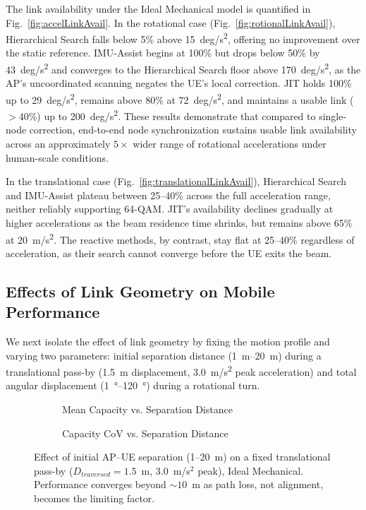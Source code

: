 \documentclass[fleqn,10pt]{wlscirep}
\newcommand{\rev}[1]{{\color{revblue}#1}}
\begin{document}
The link availability under the Ideal Mechanical model is quantified in Fig.~\ref{fig:accelLinkAvail}. In the rotational case (Fig.~\ref{fig:rotionalLinkAvail}), Hierarchical Search falls below 5\% above \SI{15}{deg/s^2}, offering no improvement over the static reference. IMU-Assist begins at 100\% but drops below 50\% by \SI{43}{deg/s^2} and converges to the Hierarchical Search floor above \SI{170}{deg/s^2}, as the AP's uncoordinated scanning negates the UE's local correction. JIT holds 100\% up to \SI{29}{deg/s^2}, remains above 80\% at \SI{72}{deg/s^2}, and maintains a usable link ($>$40\%) up to \SI{200}{deg/s^2}. These results demonstrate that compared to single-node correction, end-to-end node synchronization \rev{sustains usable link availability across an approximately $5\times$ wider range of rotational accelerations under human-scale conditions}.

In the translational case (Fig.~\ref{fig:translationalLinkAvail}), Hierarchical Search and IMU-Assist plateau between 25--40\% across the full acceleration range, neither reliably supporting 64-QAM. JIT's availability declines gradually at higher accelerations as the beam residence time shrinks, but remains above 65\% at \SI{20}{m/s^2}. The reactive methods, by contrast, stay flat at 25--40\% regardless of acceleration, as their search cannot converge before the UE exits the beam.



\subsection*{Effects of Link Geometry on Mobile Performance}

We next isolate the effect of link geometry by fixing the motion profile and varying two parameters: initial separation distance (\SIrange{1}{20}{m}) during a translational pass-by (\SI{1.5}{m} displacement, \SI{3.0}{m/s^2} peak acceleration) and total angular displacement (\SIrange{1}{120}{\degree}) during a rotational turn.

\begin{figure}[h!]
    \centering
    \begin{subfigure}{0.495\linewidth}
        
        \vspace{-25pt}
        \caption{Mean Capacity vs. Separation Distance}
        \label{fig:dist_rate}
    \end{subfigure}
    \hfill
    \begin{subfigure}{0.495\linewidth}
        
        \vspace{-25pt}
        \caption{Capacity CoV vs. Separation Distance}
        \label{fig:dist_cov}
    \end{subfigure}
    \caption{Effect of initial AP--UE separation (1--20~m) on a fixed translational pass-by ($D_{traversed} = 1.5$~m, $3.0$~m/s$^2$ peak), Ideal Mechanical. Performance converges beyond ${\sim}10$~m as path loss, not alignment, becomes the limiting factor.}
    \vspace{-5pt}
\end{figure}
\end{document}
